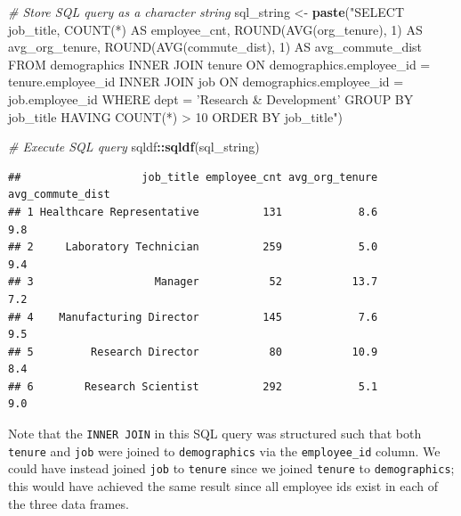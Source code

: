 \documentclass[]{book}
\newenvironment{Shaded}{\begin{snugshade}}{\end{snugshade}}
\newcommand{\CommentTok}[1]{\textcolor[rgb]{0.56,0.35,0.01}{\textit{#1}}}
\newcommand{\KeywordTok}[1]{\textcolor[rgb]{0.13,0.29,0.53}{\textbf{#1}}}
\newcommand{\NormalTok}[1]{#1}
\newcommand{\OperatorTok}[1]{\textcolor[rgb]{0.81,0.36,0.00}{\textbf{#1}}}
\newcommand{\StringTok}[1]{\textcolor[rgb]{0.31,0.60,0.02}{#1}}
\begin{document}
\begin{Shaded}
\begin{Highlighting}[]
\CommentTok{# Store SQL query as a character string}
\NormalTok{sql_string <-}\StringTok{ }\KeywordTok{paste}\NormalTok{(}\StringTok{"SELECT}
\StringTok{                      job_title,}
\StringTok{                      COUNT(*) AS employee_cnt,}
\StringTok{                      ROUND(AVG(org_tenure), 1) AS avg_org_tenure,}
\StringTok{                      ROUND(AVG(commute_dist), 1) AS avg_commute_dist}
\StringTok{                    FROM}
\StringTok{                        demographics}
\StringTok{                      INNER JOIN}
\StringTok{                        tenure}
\StringTok{                      ON}
\StringTok{                        demographics.employee_id = tenure.employee_id}
\StringTok{                      INNER JOIN}
\StringTok{                        job}
\StringTok{                      ON}
\StringTok{                        demographics.employee_id = job.employee_id}
\StringTok{                    WHERE}
\StringTok{                      dept = 'Research & Development'}
\StringTok{                    GROUP BY}
\StringTok{                      job_title}
\StringTok{                    HAVING}
\StringTok{                      COUNT(*) > 10}
\StringTok{                    ORDER BY}
\StringTok{                      job_title"}\NormalTok{)}

\CommentTok{# Execute SQL query}
\NormalTok{sqldf}\OperatorTok{::}\KeywordTok{sqldf}\NormalTok{(sql_string)}
\end{Highlighting}
\end{Shaded}

\begin{verbatim}
##                   job_title employee_cnt avg_org_tenure avg_commute_dist
## 1 Healthcare Representative          131            8.6              9.8
## 2     Laboratory Technician          259            5.0              9.4
## 3                   Manager           52           13.7              7.2
## 4    Manufacturing Director          145            7.6              9.5
## 5         Research Director           80           10.9              8.4
## 6        Research Scientist          292            5.1              9.0
\end{verbatim}

Note that the \texttt{INNER\ JOIN} in this SQL query was structured such that both \texttt{tenure} and \texttt{job} were joined to \texttt{demographics} via the \texttt{employee\_id} column. We could have instead joined \texttt{job} to \texttt{tenure} since we joined \texttt{tenure} to \texttt{demographics}; this would have achieved the same result since all employee ids exist in each of the three data frames.
\end{document}

